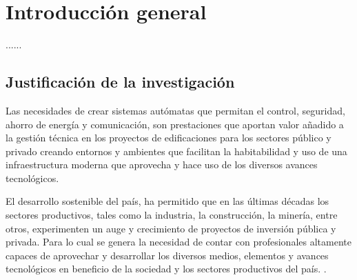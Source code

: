 
\chapter{Introducción general} %

\label{Chapter1} %
\label{IntroGeneral}
......

\newcommand{\keyword}[1]{\textbf{#1}}
\newcommand{\tabhead}[1]{\textbf{#1}}
\newcommand{\code}[1]{\texttt{#1}}
\newcommand{\file}[1]{\texttt{\bfseries#1}}
\newcommand{\option}[1]{\texttt{\itshape#1}}
\newcommand{\grados}{$^{\circ}$}






\section{Justificación de la investigación}

Las necesidades de crear sistemas autómatas que permitan el control, seguridad, ahorro de energía y comunicación, son prestaciones que aportan valor añadido a la gestión técnica en los proyectos de edificaciones para los sectores público y privado creando entornos y ambientes que facilitan la habitabilidad y uso de una infraestructura moderna que aprovecha y hace uso de los diversos avances tecnológicos.

El desarrollo sostenible del país, ha permitido que en las últimas décadas los sectores productivos, tales como la industria, la construcción, la minería, entre otros, experimenten un auge y crecimiento de proyectos de inversión pública y privada. Para lo cual se genera la necesidad de contar con profesionales altamente capaces de aprovechar y desarrollar los diversos medios, elementos y avances tecnológicos en beneficio de la sociedad y los sectores productivos del país. \citep{ARTICLE:2}.

